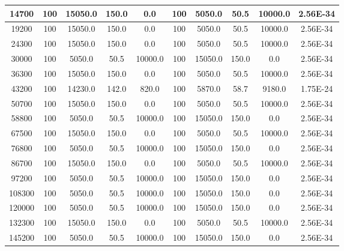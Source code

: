 \begin{tabular}{|c|c|c|c|c|c|c|c|c|c|}
14700 & 100 & 15050.0 & 150.0 & 0.0 & 100 & 5050.0 & 50.5 & 10000.0 & 2.56E-34\\ \hline
19200 & 100 & 15050.0 & 150.0 & 0.0 & 100 & 5050.0 & 50.5 & 10000.0 & 2.56E-34\\ \hline
24300 & 100 & 15050.0 & 150.0 & 0.0 & 100 & 5050.0 & 50.5 & 10000.0 & 2.56E-34\\ \hline
30000 & 100 & 5050.0 & 50.5 & 10000.0 & 100 & 15050.0 & 150.0 & 0.0 & 2.56E-34\\ \hline
36300 & 100 & 15050.0 & 150.0 & 0.0 & 100 & 5050.0 & 50.5 & 10000.0 & 2.56E-34\\ \hline
43200 & 100 & 14230.0 & 142.0 & 820.0 & 100 & 5870.0 & 58.7 & 9180.0 & 1.75E-24\\ \hline
50700 & 100 & 15050.0 & 150.0 & 0.0 & 100 & 5050.0 & 50.5 & 10000.0 & 2.56E-34\\ \hline
58800 & 100 & 5050.0 & 50.5 & 10000.0 & 100 & 15050.0 & 150.0 & 0.0 & 2.56E-34\\ \hline
67500 & 100 & 15050.0 & 150.0 & 0.0 & 100 & 5050.0 & 50.5 & 10000.0 & 2.56E-34\\ \hline
76800 & 100 & 5050.0 & 50.5 & 10000.0 & 100 & 15050.0 & 150.0 & 0.0 & 2.56E-34\\ \hline
86700 & 100 & 15050.0 & 150.0 & 0.0 & 100 & 5050.0 & 50.5 & 10000.0 & 2.56E-34\\ \hline
97200 & 100 & 5050.0 & 50.5 & 10000.0 & 100 & 15050.0 & 150.0 & 0.0 & 2.56E-34\\ \hline
108300 & 100 & 5050.0 & 50.5 & 10000.0 & 100 & 15050.0 & 150.0 & 0.0 & 2.56E-34\\ \hline
120000 & 100 & 5050.0 & 50.5 & 10000.0 & 100 & 15050.0 & 150.0 & 0.0 & 2.56E-34\\ \hline
132300 & 100 & 15050.0 & 150.0 & 0.0 & 100 & 5050.0 & 50.5 & 10000.0 & 2.56E-34\\ \hline
145200 & 100 & 5050.0 & 50.5 & 10000.0 & 100 & 15050.0 & 150.0 & 0.0 & 2.56E-34\\ \hline
\end{tabular}